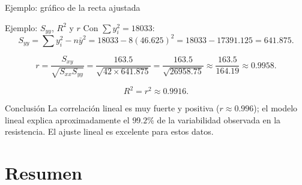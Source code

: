 \documentclass[aspectratio=169,11pt]{beamer}
\begin{document}
\begin{frame}{Ejemplo: gráfico de la recta ajustada}
\begin{center}
\end{center}
\end{frame}

\begin{frame}{Ejemplo: $S_{yy}$, $R^2$ y $r$}
Con $\sum y_i^2 = 18033$:
\[
S_{yy} = \sum y_i^2 - n\bar y^2 = 18033 - 8(46.625)^2 = 18033-17391.125 = 641.875.
\]

\[
r = \frac{S_{xy}}{\sqrt{S_{xx}S_{yy}}} = \frac{163.5}{\sqrt{42 \times 641.875}} = \frac{163.5}{\sqrt{26958.75}} \approx \frac{163.5}{164.19} \approx 0.9958.
\]

\[
R^2 = r^2 \approx 0.9916.
\]

\begin{block}{Conclusión}
La correlación lineal es muy fuerte y positiva ($r\approx 0.996$); el modelo lineal explica aproximadamente el $99.2\%$ de la variabilidad observada en la resistencia. El ajuste lineal es excelente para estos datos.
\end{block}
\end{frame}

\section{Resumen}
\end{document}
